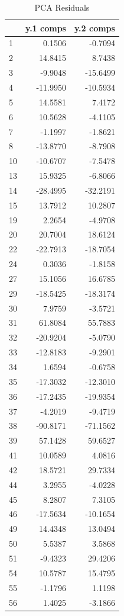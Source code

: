\documentclass[
  letterpaper,
  DIV=11,
  numbers=noendperiod]{scrreprt}
\begin{document}
\begin{table}

\caption{PCA Residuals}
\centering
\begin{tabular}[t]{l|r|r}
\hline
  & y.1 comps & y.2 comps\\
\hline
1 & 0.1506 & -0.7094\\
\hline
2 & 14.8415 & 8.7438\\
\hline
3 & -9.9048 & -15.6499\\
\hline
4 & -11.9950 & -10.5934\\
\hline
5 & 14.5581 & 7.4172\\
\hline
6 & 10.5628 & -4.1105\\
\hline
7 & -1.1997 & -1.8621\\
\hline
8 & -13.8770 & -8.7908\\
\hline
10 & -10.6707 & -7.5478\\
\hline
13 & 15.9325 & -6.8066\\
\hline
14 & -28.4995 & -32.2191\\
\hline
15 & 13.7912 & 10.2807\\
\hline
19 & 2.2654 & -4.9708\\
\hline
20 & 20.7004 & 18.6124\\
\hline
22 & -22.7913 & -18.7054\\
\hline
24 & 0.3036 & -1.8158\\
\hline
27 & 15.1056 & 16.6785\\
\hline
29 & -18.5425 & -18.3174\\
\hline
30 & 7.9759 & -3.5721\\
\hline
31 & 61.8084 & 55.7883\\
\hline
32 & -20.9204 & -5.0790\\
\hline
33 & -12.8183 & -9.2901\\
\hline
34 & 1.6594 & -0.6758\\
\hline
35 & -17.3032 & -12.3010\\
\hline
36 & -17.2435 & -19.9354\\
\hline
37 & -4.2019 & -9.4719\\
\hline
38 & -90.8171 & -71.1562\\
\hline
39 & 57.1428 & 59.6527\\
\hline
41 & 10.0589 & 4.0816\\
\hline
42 & 18.5721 & 29.7334\\
\hline
44 & 3.2955 & -4.0228\\
\hline
45 & 8.2807 & 7.3105\\
\hline
46 & -17.5634 & -10.1654\\
\hline
49 & 14.4348 & 13.0494\\
\hline
50 & 5.5387 & 3.5868\\
\hline
51 & -9.4323 & 29.4206\\
\hline
54 & 10.5787 & 15.4795\\
\hline
55 & -1.1796 & 1.1198\\
\hline
56 & 1.4025 & -3.1866\\
\hline
\end{tabular}
\end{table}
\end{document}
